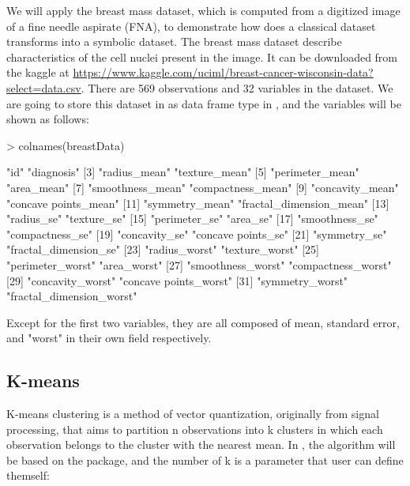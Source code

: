 \documentclass[article]{jss}
\begin{document}
We will apply the breast mass dataset, which is computed from a digitized image of a fine needle aspirate (FNA), to demonstrate how does a classical dataset transforms into a symbolic dataset. The breast mass dataset describe characteristics of the cell nuclei present in the image. It can be downloaded from the kaggle at \url{https://www.kaggle.com/uciml/breast-cancer-wisconsin-data?select=data.csv}. There are 569 observations and 32 variables in the dataset. We are going to store this dataset in  as data frame type in , and the variables will be shown as follows:
\begin{Schunk}
\begin{Sinput}
> colnames(breastData)
\end{Sinput}
\begin{Soutput}
 [1] "id"                      "diagnosis"              
 [3] "radius_mean"             "texture_mean"           
 [5] "perimeter_mean"          "area_mean"              
 [7] "smoothness_mean"         "compactness_mean"       
 [9] "concavity_mean"          "concave points_mean"    
[11] "symmetry_mean"           "fractal_dimension_mean" 
[13] "radius_se"               "texture_se"             
[15] "perimeter_se"            "area_se"                
[17] "smoothness_se"           "compactness_se"         
[19] "concavity_se"            "concave points_se"      
[21] "symmetry_se"             "fractal_dimension_se"   
[23] "radius_worst"            "texture_worst"          
[25] "perimeter_worst"         "area_worst"             
[27] "smoothness_worst"        "compactness_worst"      
[29] "concavity_worst"         "concave points_worst"   
[31] "symmetry_worst"          "fractal_dimension_worst"
\end{Soutput}
\end{Schunk}

Except for the first two variables, they are all composed of mean, standard error, and "worst" in their own field respectively.

\subsection{K-means}

K-means clustering is a method of vector quantization, originally from signal processing, that aims to partition n observations into k clusters in which each observation belongs to the cluster with the nearest mean. In , the algorithm will be based on the  package, and the number of k is a parameter that user can define themself:
\end{document}
